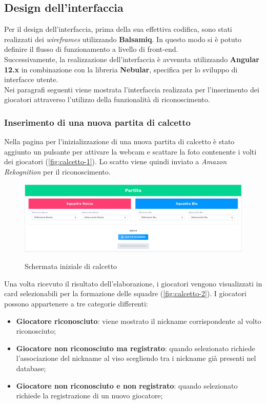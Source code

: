 		
		
	
	
	\subsection{Design dell'interfaccia}
	Per il design dell'interfaccia, prima della sua effettiva codifica, sono stati realizzati dei \emph{wireframes} utilizzando \textbf{Balsamiq}. In questo modo si è potuto definire il flusso di funzionamento a livello di front-end. \\ 

	\noindent Successivamente, la realizzazione dell'interfaccia è avvenuta utilizzando \textbf{Angular 12.x} in combinazione con la libreria 
	\textbf{Nebular}, specifica per lo sviluppo di interfacce utente. \\
	
	\noindent Nei paragrafi seguenti viene mostrata l'interfaccia realizzata per l'inserimento dei giocatori attraverso l'utilizzo della funzionalità di riconoscimento.
	
		\subsubsection{Inserimento di una nuova partita di calcetto}
		Nella pagina per l'inizializzazione di una nuova partita di calcetto è stato aggiunto un pulsante per attivare la webcam e scattare la foto  contenente i volti dei giocatori (\autoref{fig:calcetto-1}). Lo scatto viene quindi inviato a \emph{Amazon Rekognition} per il riconoscimento. 
		
		\begin{figure}[H]
			\centering
			\includegraphics[width=\textwidth]{immagini/calcetto-1.png} \\
			\caption{\label{fig:calcetto-1} Schermata iniziale di calcetto}
		\end{figure}
	
		\noindent Una volta ricevuto il risultato dell'elaborazione, i giocatori vengono visualizzati in card selezionabili per la formazione delle squadre (\autoref{fig:calcetto-2}). I giocatori possono appartenere a tre categorie differenti:
		\begin{itemize}
			\item \textbf{Giocatore riconosciuto}: viene mostrato il nickname corrispondente al volto riconosciuto;
			\item \textbf{Giocatore non riconosciuto ma registrato}: quando selezionato richiede l'associazione del nickname al viso scegliendo tra i nickname già presenti nel database; 
			\item\textbf{Giocatore non riconosciuto e non registrato}: quando selezionato richiede la registrazione di un nuovo giocatore; 
		\end{itemize}
	
